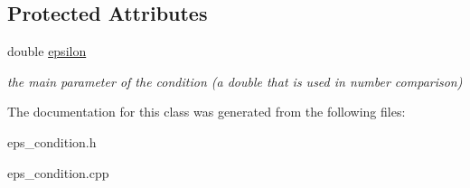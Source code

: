 \subsection*{Protected Attributes}
\begin{DoxyCompactItemize}
\item 
\mbox{\label{class_eps_condition_a43f4dafd1f2fd2b425a7a51a74f1551f}} 
double \hyperlink{class_eps_condition_a43f4dafd1f2fd2b425a7a51a74f1551f}{epsilon}
\begin{DoxyCompactList}\small\item\em the main parameter of the condition (a double that is used in number comparison) \end{DoxyCompactList}\end{DoxyCompactItemize}


The documentation for this class was generated from the following files\+:\begin{DoxyCompactItemize}
\item 
eps\+\_\+condition.\+h\item 
eps\+\_\+condition.\+cpp\end{DoxyCompactItemize}
